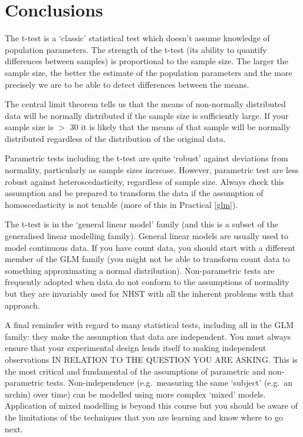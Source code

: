 \documentclass[
  11pt,
  a4paper,
]{book}
\begin{document}
\hypertarget{conclusions-3}{%
\section{Conclusions}\label{conclusions-3}}

The t-test is a `classic' statistical test which doesn't assume knowledge of population parameters. The strength of the t-test (its ability to quantify differences between samples) is proportional to the sample size. The larger the sample size, the better the estimate of the population parameters and the more precisely we are to be able to detect differences between the means.

The central limit theorem tells us that the means of non-normally distributed data will be normally distributed if the sample size is sufficiently large. If your sample size is \(>\) 30 it is likely that the means of that sample will be normally distributed regardless of the distribution of the original data.

Parametric tests including the t-test are quite `robust' against deviations from normality, particularly as sample sizes increase. However, parametric test are less robust against heteroscedasticity, regardless of sample size. Always check this assumption and be prepared to transform the data if the assumption of homoscedasticity is not tenable (more of this in Practical \ref{glm}).

The t-test is in the `general linear model' family (and this is a subset of the generalised linear modelling family). General linear models are usually used to model continuous data. If you have count data, you should start with a different member of the GLM family (you might not be able to transform count data to something approximating a normal distribution). Non-parametric tests are frequently adopted when data do not conform to the assumptions of normality but they are invariably used for NHST with all the inherent problems with that approach.

A final reminder with regard to many statistical tests, including all in the GLM family: they make the assumption that data are independent. You must always ensure that your experimental design lends itself to making independent observations IN RELATION TO THE QUESTION YOU ARE ASKING. This is the most critical and fundamental of the assumptions of parametric and non-parametric tests. Non-independence (e.g.~measuring the same `subject' (e.g.~an urchin) over time) can be modelled using more complex `mixed' models. Application of mixed modelling is beyond this course but you should be aware of the limitations of the techniques that you are learning and know where to go next.
\end{document}
